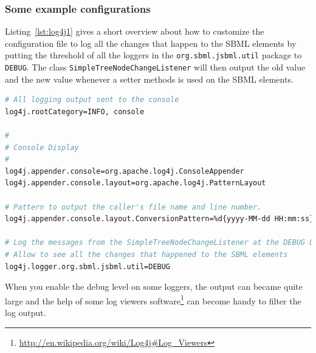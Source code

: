 \subsubsection{Some example configurations}
%

Listing~\vref{lst:log4j1} gives a short overview about how to
customize the configuration file to log all the changes that happen to the SBML
elements by putting the threshold of all the loggers in the
\texttt{org.sbml.jsbml.util} package to \texttt{DEBUG}. The class
\texttt{SimpleTreeNodeChangeListener}
%
will then output the old value and the new value whenever a setter methods is
used on the SBML elements.
\begin{lstlisting}[language=bash,%numbers=none,
caption={A simple log4j example.},label=lst:log4j1]
# All logging output sent to the console
log4j.rootCategory=INFO, console

#
# Console Display
#
log4j.appender.console=org.apache.log4j.ConsoleAppender
log4j.appender.console.layout=org.apache.log4j.PatternLayout

# Pattern to output the caller's file name and line number.
log4j.appender.console.layout.ConversionPattern=%d{yyyy-MM-dd HH:mm:ss} - %5p (%F:%L) - %m%n

# Log the messages from the SimpleTreeNodeChangeListener at the DEBUG Level
# Allow to see all the changes that happened to the SBML elements
log4j.logger.org.sbml.jsbml.util=DEBUG
\end{lstlisting}

When you enable the debug level
%
on some loggers, the output can became quite large and the help of some log
viewers software\footnote{\url{http://en.wikipedia.org/wiki/Log4j\#Log_Viewers}}
can become handy to filter the log output.

